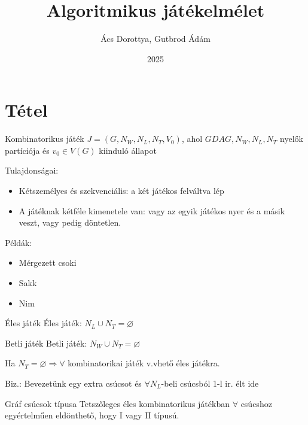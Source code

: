 


\title{Algoritmikus játékelmélet}
\author{Ács Dorottya, Gutbrod Ádám}
\date{2025}
\maketitle

\tableofcontents
\newpage



\section{Tétel}
\begin{definition}{Kombinatorikus játék}{}
$ J=(G,N_W,N_L,N_T,V_0) $, ahol $ G DAG, N_W,N_L,N_T$ nyelők partíciója és $v_0 \in V(G)$ kiinduló állapot
\end{definition}
Tulajdonságai:
\begin{itemize}
    \item Kétszemélyes és szekvenciális: a két játékos felváltva lép
    \item A játéknak kétféle kimenetele van: vagy az egyik játékos nyer és a másik veszt, vagy pedig döntetlen.
\end{itemize}
Példák:
\begin{itemize}
    \item Mérgezett csoki
    \item Sakk
    \item Nim
\end{itemize}

\begin{definition}{Éles játék}{}
Éles játék: $N_L \cup N_T=\varnothing$
\end{definition}

\begin{definition}{Betli játék}{}
Betli játék: $N_W \cup N_T = \varnothing$
\end{definition}

\begin{observation}{}{}
Ha $N_T = \varnothing \Rightarrow \forall$ kombinatorikai játék v.vhető éles játékra.
\end{observation}

Biz.: Bevezetünk egy extra csúcsot és $\forall N_L$-beli csúcsból 1-l ir. élt ide \\
\begin{theorem}{Gráf csúcsok típusa}{}
    Tetszőleges éles kombinatorikus játékban $\forall$ csúcshoz egyértelműen eldönthető, hogy I vagy II típusú.
\end{theorem}

